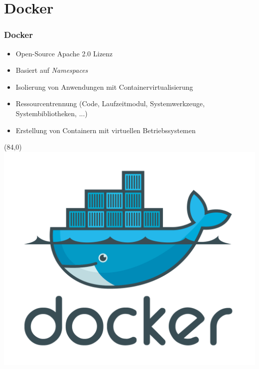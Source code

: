 \documentclass{beamer}
\begin{document}

\section{Docker}
\begin{frame}
\frametitle{Docker}

\begin{itemize}
\setlength{\itemsep}{12pt}
\item Open-Source Apache 2.0 Lizenz
\item Basiert auf \textit{Namespaces}
\item Isolierung von Anwendungen mit Containervirtualisierung
\item Ressourcentrennung (Code, Laufzeitmodul, Systemwerkzeuge, Systembibliotheken, ...)
\item Erstellung von Containern mit virtuellen Betriebssystemen
\end{itemize}

\begin{textblock}{20}(84,0)
\includegraphics[scale=0.22]{docker.png}
\end{textblock}

\end{frame}
\end{document}
